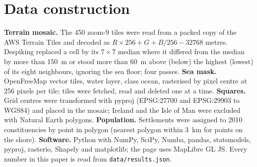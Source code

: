 \section{Data construction}
\textbf{Terrain mosaic.} The 450 zoom-9 tiles were read from a packed copy of the AWS Terrain Tiles and decoded as $R\times256+G+B/256-32768$ metres. Despiking replaced a cell by its $7\times7$ median where it differed from the median by more than 150~m or stood more than 60~m above (below) the highest (lowest) of its eight neighbours, ignoring the sea floor; four passes. \textbf{Sea mask.} OpenFreeMap vector tiles, water layer, class ocean, rasterised by pixel centre at 256 pixels per tile; tiles were fetched, read and deleted one at a time. \textbf{Squares.} Grid centres were transformed with pyproj (EPSG:27700 and EPSG:29903 to WGS84) and placed in the mosaic; Ireland and the Isle of Man were excluded with Natural Earth polygons. \textbf{Population.} Settlements were assigned to 2010 constituencies by point in polygon (nearest polygon within 3~km for points on the shore). \textbf{Software.} Python with NumPy, SciPy, Numba, pandas, statsmodels, pyproj, rasterio, Shapely and matplotlib; the page uses MapLibre GL JS. Every number in this paper is read from \texttt{data/results.json}.
